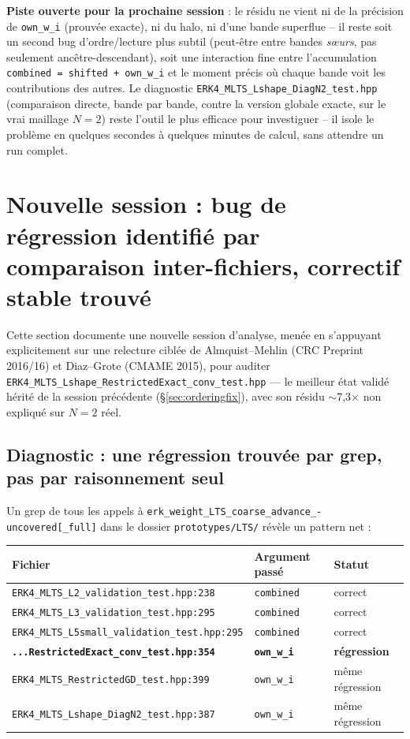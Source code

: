\documentclass[11pt]{article}
\begin{document}
\textbf{Piste ouverte pour la prochaine session} : le résidu ne vient ni
de la précision de \texttt{own\_w\_i} (prouvée exacte), ni du halo, ni
d'une bande superflue -- il reste soit un second bug d'ordre/lecture
plus subtil (peut-être entre bandes \emph{sœurs}, pas seulement
ancêtre-descendant), soit une interaction fine entre l'accumulation
\texttt{combined = shifted + own\_w\_i} et le moment précis où chaque
bande \og voit \fg{} les contributions des autres. Le diagnostic
\texttt{ERK4\_MLTS\_Lshape\_DiagN2\_test.hpp} (comparaison directe,
bande par bande, contre la version globale exacte, sur le vrai maillage
$N=2$) reste l'outil le plus efficace pour investiguer -- il isole le
problème en quelques secondes à quelques minutes de calcul, sans
attendre un run complet.

\section{Nouvelle session : bug de régression identifié par comparaison
inter-fichiers, correctif stable trouvé}
\label{sec:regressionfix}

Cette section documente une nouvelle session d'analyse, menée en
s'appuyant explicitement sur une relecture ciblée de Almquist--Mehlin
(CRC Preprint 2016/16) et Diaz--Grote (CMAME 2015), pour auditer
\texttt{ERK4\_MLTS\_Lshape\_RestrictedExact\_conv\_test.hpp} --- le
\og meilleur état validé \fg{} hérité de la session précédente
(\S\ref{sec:orderingfix}), avec son résidu $\sim$7,3$\times$ non
expliqué sur $N=2$ réel.

\subsection{Diagnostic : une régression trouvée par grep, pas par
raisonnement seul}
\label{sec:regressiondiag}

Un grep de tous les appels à \texttt{erk\_weight\_LTS\_coarse\_advance\_-
uncovered[\_full]} dans le dossier \texttt{prototypes/LTS/} révèle un
pattern net :

\begin{center}
\begin{tabular}{@{}p{7.5cm}p{3cm}p{2.2cm}@{}}
\toprule
Fichier & Argument passé & Statut \\
\midrule
\texttt{ERK4\_MLTS\_L2\_validation\_test.hpp:238} & \texttt{combined} & correct \\
\texttt{ERK4\_MLTS\_L3\_validation\_test.hpp:295} & \texttt{combined} & correct \\
\texttt{ERK4\_MLTS\_L5small\_validation\_test.hpp:295} & \texttt{combined} & correct \\
\textbf{\texttt{...RestrictedExact\_conv\_test.hpp:354}} & \textbf{\texttt{own\_w\_i}} & \textbf{régression} \\
\texttt{ERK4\_MLTS\_RestrictedGD\_test.hpp:399} & \texttt{own\_w\_i} & même régression \\
\texttt{ERK4\_MLTS\_Lshape\_DiagN2\_test.hpp:387} & \texttt{own\_w\_i} & même régression \\
\bottomrule
\end{tabular}
\end{center}
\end{document}

